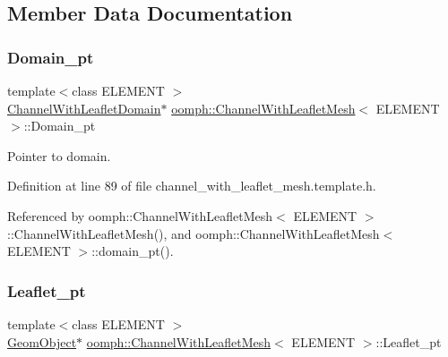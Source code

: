 \subsection{Member Data Documentation}
\mbox{\label{classoomph_1_1ChannelWithLeafletMesh_a20dc25dbf38222156f72b6d6213c5246}} 
\subsubsection{\texorpdfstring{Domain\+\_\+pt}{Domain\_pt}}
{\footnotesize\ttfamily template$<$class E\+L\+E\+M\+E\+NT $>$ \\
\hyperlink{classoomph_1_1ChannelWithLeafletDomain}{Channel\+With\+Leaflet\+Domain}$\ast$ \hyperlink{classoomph_1_1ChannelWithLeafletMesh}{oomph\+::\+Channel\+With\+Leaflet\+Mesh}$<$ E\+L\+E\+M\+E\+NT $>$\+::Domain\+\_\+pt\hspace{0.3cm}{\ttfamily [protected]}}



Pointer to domain. 



Definition at line 89 of file channel\+\_\+with\+\_\+leaflet\+\_\+mesh.\+template.\+h.



Referenced by oomph\+::\+Channel\+With\+Leaflet\+Mesh$<$ E\+L\+E\+M\+E\+N\+T $>$\+::\+Channel\+With\+Leaflet\+Mesh(), and oomph\+::\+Channel\+With\+Leaflet\+Mesh$<$ E\+L\+E\+M\+E\+N\+T $>$\+::domain\+\_\+pt().

\mbox{\label{classoomph_1_1ChannelWithLeafletMesh_ab0d744f2c35b9397dd35cc75a2db9e60}} 
\subsubsection{\texorpdfstring{Leaflet\+\_\+pt}{Leaflet\_pt}}
{\footnotesize\ttfamily template$<$class E\+L\+E\+M\+E\+NT $>$ \\
\hyperlink{classoomph_1_1GeomObject}{Geom\+Object}$\ast$ \hyperlink{classoomph_1_1ChannelWithLeafletMesh}{oomph\+::\+Channel\+With\+Leaflet\+Mesh}$<$ E\+L\+E\+M\+E\+NT $>$\+::Leaflet\+\_\+pt\hspace{0.3cm}{\ttfamily [protected]}}



